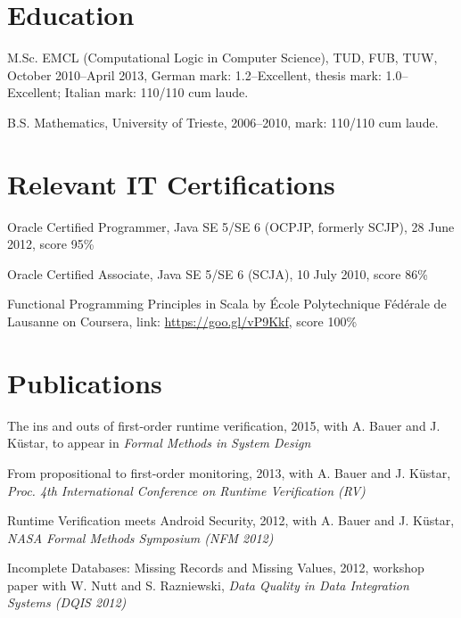 \documentclass[letterpaper]{article}
\renewenvironment{itemize}{
  \begin{list}{}{
    \setlength{\leftmargin}{1.5em}
  }
}{
  \end{list}
}
\begin{document}
\section*{Education}
\begin{itemize}
  \item M.Sc. EMCL (Computational Logic in Computer Science), TUD, FUB, TUW, October 2010--April 2013, German mark: 1.2--Excellent, thesis mark: 1.0--Excellent; Italian mark: 110/110 cum laude.

  \item B.S. Mathematics, University of Trieste, 2006--2010, mark: 110/110 cum laude. 
\end{itemize}

\section*{Relevant IT Certifications}
\begin{itemize}
\item Oracle Certified Programmer, Java SE 5/SE 6 (OCPJP, formerly SCJP), 28 June 2012, score 95\%
\item Oracle Certified Associate, Java SE 5/SE 6 (SCJA), 10 July 2010, score 86\%
\item Functional Programming Principles in Scala by \'Ecole Polytechnique F\'ed\'erale de Lausanne on Coursera,  
link: \href{https://goo.gl/vP9Kkf}{https://goo.gl/vP9Kkf}, score 100\%
\end{itemize}

\section*{Publications}
\begin{itemize}
\item The ins and outs of first-order runtime verification, 2015, with A. Bauer and J. K\"{u}star, to appear in {\it Formal Methods in System Design}

\item From propositional to first-order monitoring, 2013, with A. Bauer and J. K\"{u}star, {\it Proc. 4th International Conference on Runtime Verification (RV)}

\item Runtime Verification meets Android Security, 2012, with A. Bauer and J. K\"{u}star, {\it NASA Formal Methods Symposium (NFM 2012)}

\item Incomplete Databases: Missing Records and Missing Values, 2012, workshop paper with W. Nutt and S. Razniewski, {\it Data Quality in Data Integration Systems (DQIS 2012)}
\end{itemize}
\end{document}
